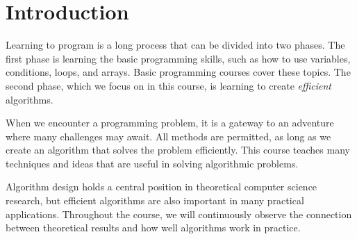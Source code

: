 \chapter{Introduction}

Learning to program is a long process that can be divided into two phases. The first phase is learning the basic programming skills, such as how to use variables, conditions, loops, and arrays. Basic programming courses cover these topics. The second phase, which we focus on in this course, is learning to create \emph{efficient} algorithms.

When we encounter a programming problem, it is a gateway to an adventure where many challenges may await. All methods are permitted, as long as we create an algorithm that solves the problem efficiently. This course teaches many techniques and ideas that are useful in solving algorithmic problems.

Algorithm design holds a central position in theoretical computer science research, but efficient algorithms are also important in many practical applications. Throughout the course, we will continuously observe the connection between theoretical results and how well algorithms work in practice.

